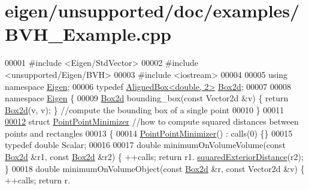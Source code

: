 \hypertarget{eigen_2unsupported_2doc_2examples_2_b_v_h___example_8cpp_source}{}\section{eigen/unsupported/doc/examples/\+B\+V\+H\+\_\+\+Example.cpp}
\label{eigen_2unsupported_2doc_2examples_2_b_v_h___example_8cpp_source}

\begin{DoxyCode}
00001 \textcolor{preprocessor}{#include <Eigen/StdVector>}
00002 \textcolor{preprocessor}{#include <unsupported/Eigen/BVH>}
00003 \textcolor{preprocessor}{#include <iostream>}
00004 
00005 \textcolor{keyword}{using namespace }\hyperlink{namespace_eigen}{Eigen};
00006 \textcolor{keyword}{typedef} \hyperlink{group___geometry___module_class_eigen_1_1_aligned_box}{AlignedBox<double, 2>} \hyperlink{group___geometry___module_class_eigen_1_1_aligned_box}{Box2d};
00007 
00008 \textcolor{keyword}{namespace }\hyperlink{namespace_eigen}{Eigen} \{
00009   \hyperlink{group___geometry___module_class_eigen_1_1_aligned_box}{Box2d} bounding\_box(\textcolor{keyword}{const} Vector2d &v) \{ \textcolor{keywordflow}{return} \hyperlink{group___geometry___module_class_eigen_1_1_aligned_box}{Box2d}(v, v); \} \textcolor{comment}{//compute the bounding box of a
       single point}
00010 \}
00011 
\hyperlink{struct_point_point_minimizer}{00012} \textcolor{keyword}{struct }\hyperlink{struct_point_point_minimizer}{PointPointMinimizer} \textcolor{comment}{//how to compute squared distances between points and
       rectangles}
00013 \{
00014   \hyperlink{struct_point_point_minimizer}{PointPointMinimizer}() : calls(0) \{\}
00015   \textcolor{keyword}{typedef} \textcolor{keywordtype}{double} Scalar;
00016 
00017   \textcolor{keywordtype}{double} minimumOnVolumeVolume(\textcolor{keyword}{const} \hyperlink{group___geometry___module_class_eigen_1_1_aligned_box}{Box2d} &r1, \textcolor{keyword}{const} \hyperlink{group___geometry___module_class_eigen_1_1_aligned_box}{Box2d} &r2) \{ ++calls; \textcolor{keywordflow}{return} r1.
      \hyperlink{group___geometry___module_aa6d9ffc81bd77da631fef6559f45cf13}{squaredExteriorDistance}(r2); \}
00018   \textcolor{keywordtype}{double} minimumOnVolumeObject(\textcolor{keyword}{const} \hyperlink{group___geometry___module_class_eigen_1_1_aligned_box}{Box2d} &r, \textcolor{keyword}{const} Vector2d &v) \{ ++calls; \textcolor{keywordflow}{return} r.

\end{DoxyCode}
